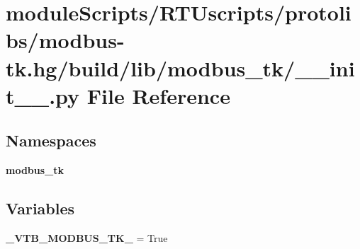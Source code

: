 \section{module\+Scripts/\+R\+T\+Uscripts/protolibs/modbus-\/tk.hg/build/lib/modbus\+\_\+tk/\+\_\+\+\_\+init\+\_\+\+\_\+.py File Reference}
\label{protolibs_2modbus-tk_8hg_2build_2lib_2modbus__tk_2____init_____8py}
\subsection*{Namespaces}
\begin{DoxyCompactItemize}
\item 
 {\bf modbus\+\_\+tk}
\end{DoxyCompactItemize}
\subsection*{Variables}
\begin{DoxyCompactItemize}
\item 
{\bf \+\_\+\+V\+T\+B\+\_\+\+M\+O\+D\+B\+U\+S\+\_\+\+T\+K\+\_\+} = True
\end{DoxyCompactItemize}

